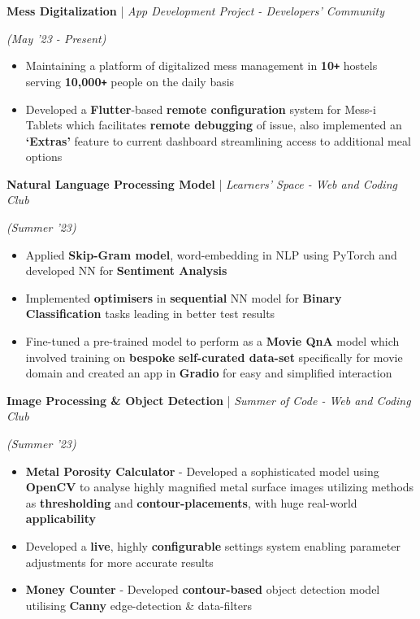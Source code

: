 \documentclass[10pt]{article}
\def\Plus{\texttt{\texttt{+}}}
\renewcommand{\subsection}[4]{
	\def\temp{#4}
	\vspace{2pt}
	{
		\large
		{\color{Green} \textbf{#1}} | {\sl #2} \filldate{#3}
		\ifx\temp\empty
		\else
		{
			\\[0.1em]
			\fontsize{11}{13.2}\selectfont
			\sl #4
		}
		\fi
	}
}
\newcommand{\filldate}[1]{\strut\hfill {\small \textit{(#1)}}}
\begin{document}
\subsection{Mess Digitalization}{App Development Project - Developers' Community}{May '23 - Present}{}
\begin{itemize}
        \item Maintaining a platform of digitalized mess management in \textbf{10\Plus} hostels serving \textbf{10,000\Plus} people on the daily basis
	\item Developed a \textbf{Flutter}-based\textbf{ remote configuration} system for Mess-i Tablets which facilitates \textbf{remote debugging} of issue, also implemented an \textbf{`Extras'} feature to current dashboard streamlining access to additional meal options
 
\end{itemize}
\subsection{Natural Language Processing Model}{Learners' Space - Web and Coding Club}{Summer '23}{}
\begin{itemize}
	\item Applied \textbf{Skip-Gram model}, word-embedding in NLP using PyTorch and developed NN for \textbf{Sentiment Analysis}
        \item Implemented \textbf{optimisers} in \textbf{sequential} NN model for \textbf{Binary Classification} tasks leading in better test results
	\item Fine-tuned a pre-trained model to perform as a \textbf{Movie QnA }model which involved training on \textbf{bespoke} \textbf{self-curated data-set} specifically for movie domain and created an app in \textbf{Gradio} for easy and simplified interaction
 
\end{itemize}
 

\subsection{Image Processing \& Object Detection}{Summer of Code - Web and Coding Club}{Summer '23}{}
\begin{itemize}
	\item \textbf{Metal Porosity Calculator} - Developed a sophisticated model using \textbf{OpenCV} to analyse highly magnified metal surface images utilizing methods as \textbf{thresholding}  and \textbf{contour-placements}, with huge real-world \textbf{applicability}
        \item Developed a \textbf{live}, highly\textbf{ configurable} settings system enabling parameter adjustments for more accurate results
	\item \textbf{Money Counter} - Developed \textbf{contour-based} object detection model utilising \textbf{Canny} edge-detection \& data-filters
 
\end{itemize}
\end{document}
